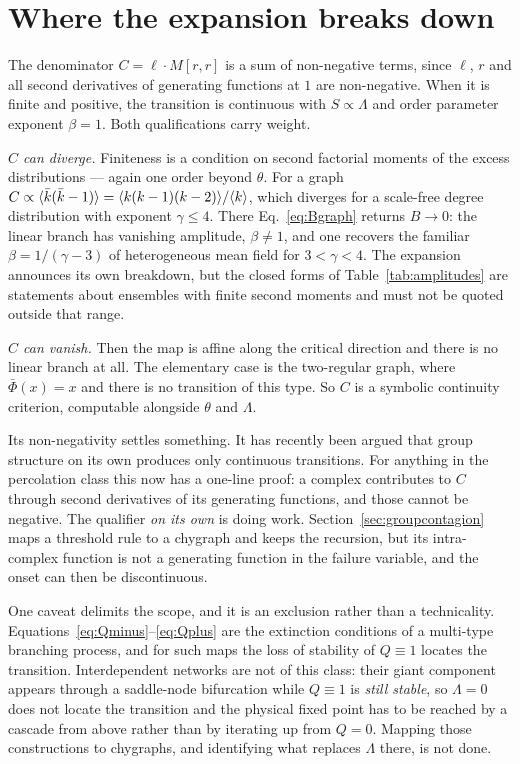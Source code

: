 \section{Where the expansion breaks down}
\label{sec:breakdown}

The denominator $C=\ell\cdot M[r,r]$ is a sum of non-negative terms, since
$\ell$, $r$ and all second derivatives of generating functions at $1$ are
non-negative. When it is finite and positive, the transition is continuous with
$S\propto\Lambda$ and order parameter exponent $\beta=1$. Both qualifications
carry weight.

\emph{$C$ can diverge.} Finiteness is a condition on second factorial moments of
the excess distributions --- again one order beyond $\theta$. For a graph
$C\propto\langle \bar k(\bar k-1) \rangle=\langle k(k-1)(k-2) \rangle/\langle k \rangle$, which diverges for a
scale-free degree distribution with exponent $\gamma\le4$. There
Eq.~\eqref{eq:Bgraph} returns $B\to0$: the linear branch has vanishing
amplitude, $\beta\ne1$, and one recovers the familiar $\beta=1/(\gamma-3)$ of
heterogeneous mean field for $3<\gamma<4$. The expansion announces its own
breakdown, but the closed forms of Table~\ref{tab:amplitudes} are statements about ensembles with finite second
moments and must not be quoted outside that range.

\emph{$C$ can vanish.} Then the map is affine along the critical direction and
there is no linear branch at all. The elementary case is the two-regular graph,
where $\bar\Phi(x)=x$ and there is no transition of this type. So $C$ is a
symbolic continuity criterion, computable alongside $\theta$ and $\Lambda$.

Its non-negativity settles something. It has recently been argued
\citep{keating2026} that group structure on its own produces only continuous
transitions. For anything in the percolation class this now has a one-line
proof: a complex contributes to $C$ through second derivatives of its
generating functions, and those cannot be negative. The qualifier \emph{on its
own} is doing work.
Section~\ref{sec:groupcontagion} maps a threshold rule to a chygraph and keeps
the recursion, but its intra-complex function is not a generating function in
the failure variable, and the onset can then be discontinuous.

One caveat delimits the scope, and it is an exclusion rather than a
technicality. Equations~\eqref{eq:Qminus}--\eqref{eq:Qplus} are the extinction
conditions of a multi-type branching process, and for such maps the loss of
stability of $Q\equiv1$ locates the transition. Interdependent networks
\citep{buldyrev2010,radicchi2015} are not of this class: their giant component
appears through a saddle-node bifurcation while $Q\equiv1$ is \emph{still
stable}, so $\Lambda=0$ does not locate the transition and the physical fixed
point has to be reached by a cascade from above rather than by iterating up from
$Q=0$. Mapping those constructions to chygraphs, and identifying what replaces
$\Lambda$ there, is not done.

